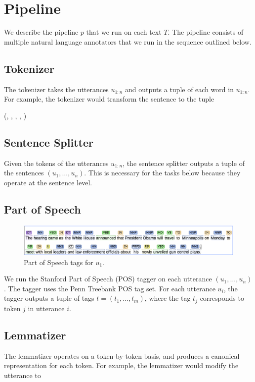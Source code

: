 
\section{Pipeline}
We describe the pipeline $p$ that we run on each text $T$. The pipeline
consists of multiple natural language annotators that we run in 
the sequence outlined below.
\citep{manning2014stanford}

\subsection{Tokenizer}
The tokenizer takes the utterances $u_{1:n}$ and outputs a tuple of
each word in $u_{1:n}$. For example, the tokenizer would transform
the sentence  to the tuple
\begin{center}
  (, , , , )
\end{center}
\subsection{Sentence Splitter}
Given the tokens of the utterances $u_{1:n}$, the sentence splitter outputs
a tuple of the sentences $(u_1,\dots,u_n)$. This is necessary
for the tasks below because they operate at the sentence level.

\subsection{Part of Speech}

\begin{figure}
\includegraphics[scale=0.33]{figures/pos.png}
\caption{
\label{fig:pos}
Part of Speech tags for $u_1$.
}
\end{figure}

We run the Stanford Part of Speech (POS) tagger \citep{toutanova2003tagger}
on each utterance $(u_1,\dots,u_n)$. The tagger uses the Penn Treebank
POS tag set. For each utterance $u_i$, the
tagger outputs a tuple of tags $t=(t_1,\dots,t_m)$, where the 
tag $t_j$ corresponds to token $j$ in utterance $i$.

\subsection{Lemmatizer}
The lemmatizer operates on a token-by-token basis, and 
produces a canonical representation for each token. For 
example, the lemmatizer would modify the utterance
 to 

